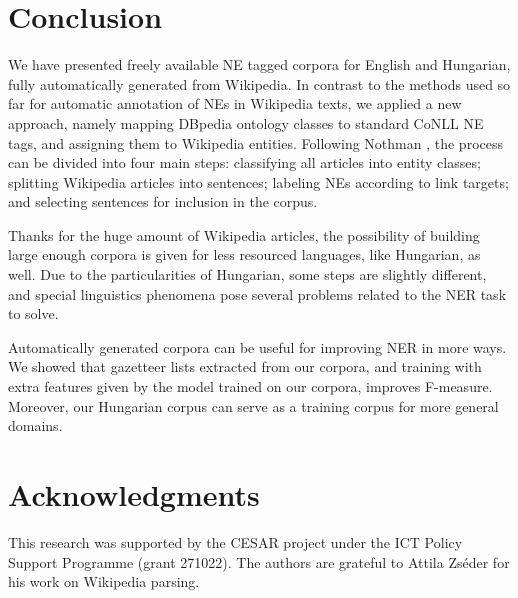 \documentclass[11pt]{article}
\begin{document}
\section{Conclusion}
\label{sec:conclusion}

We have presented freely available NE tagged corpora for English and Hungarian, fully automatically generated from Wikipedia. In contrast to the methods used so far for automatic annotation of NEs in Wikipedia texts, we applied a new approach, namely mapping DBpedia ontology classes to standard CoNLL NE tags, and assigning them to Wikipedia entities. Following Nothman , the process can be divided into four main steps:  classifying all articles into entity classes; splitting Wikipedia articles into sentences; labeling NEs according to link targets; and selecting sentences for inclusion in the corpus. 

Thanks for the huge amount of Wikipedia articles, the possibility of building large enough corpora is given for less resourced languages, like Hungarian, as well. Due to the particularities of Hungarian, some steps are slightly different, and special linguistics phenomena pose several problems related to the NER task to solve. 

Automatically generated corpora can be useful for improving NER in more ways. We showed that gazetteer lists extracted from our corpora, and training with extra features given by the model trained on our corpora, improves F-measure. Moreover, our Hungarian corpus can serve as a training corpus for more general domains. 



\section*{Acknowledgments}

This research was supported by the CESAR project under the ICT Policy Support Programme (grant 271022). The authors are grateful to Attila Zséder for his work on Wikipedia parsing.
\end{document}
